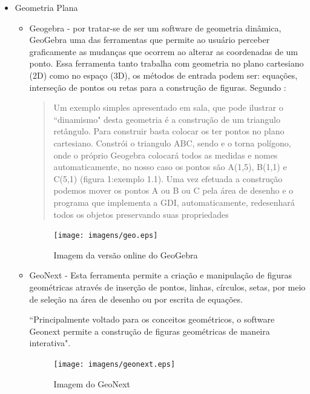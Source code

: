 \documentclass[12pt,a4paper]{article}
\begin{document}
\begin{itemize}
	\item Geometria Plana
	
	\begin{itemize}
		\item Geogebra - por tratar-se de ser um software de geometria dinâmica, GeoGebra uma das ferramentas que permite ao usuário perceber graficamente as mudanças que ocorrem ao alterar as coordenadas de um ponto. Essa ferramenta tanto trabalha com geometria no plano cartesiano (2D) como no espaço (3D), os métodos de entrada podem ser: equações, interseção de pontos ou retas para a construção de figuras. Segundo \cite{cardoso2010software}:
		
		\begin{quotation}
Um exemplo simples apresentado em sala, que pode ilustrar o ``dinamismo" desta geometria é a construção de um triangulo retângulo. Para construir basta colocar os ter pontos no plano cartesiano. Constrói o triangulo ABC, sendo e o torna polígono, onde o próprio Geogebra colocará todos as medidas e nomes automaticamente, no nosso caso os pontos são A(1,5), B(1,1) e C(5,1) (figura 1:exemplo 1.1). Uma vez efetuada a construção podemos mover os pontos A ou B ou C pela área de desenho e o programa que implementa a GDI, automaticamente, redesenhará todos os objetos preservando suas propriedades
		\end{quotation}

		\begin{figure}[htb]
			\centering
			\texttt{[image: imagens/geo.eps]} 
			\caption{Imagem da versão online do GeoGebra}
			\label{fig:imgGeogebra}
		\end{figure}

		\item GeoNext - Esta ferramenta permite a criação e manipulação de figuras geométricas através de inserção de pontos, linhas, círculos, setas, por meio de seleção na área de desenho ou por escrita de equações.
		

``Principalmente voltado para os conceitos geométricos, o software Geonext permite a construção de figuras geométricas de maneira interativa". \citep{cardoso2010software}


		\begin{figure}[htb]
			\centering
			\texttt{[image: imagens/geonext.eps]} 
			\caption{Imagem do GeoNext}
			\label{fig:imgGeonext}
		\end{figure}


\end{itemize}
\end{itemize}
\end{document}
